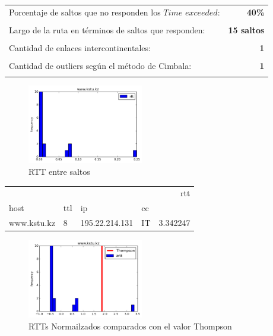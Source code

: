 \begin{center}
\begin{tabular}{p{6.5cm}r}
Porcentaje de saltos que no responden los $Time$ $exceeded$: & \textbf{40\%} \\ \\ 
Largo de la ruta en términos de saltos que responden: &\textbf{15 saltos} \\ \\
Cantidad de enlaces intercontinentales: & \textbf{1} \\ \\
Cantidad de outliers según el método de Cimbala: & \textbf{1} \\ \\
\end{tabular}
\end{center}


\begin{figure}[H]
  \centering
    \includegraphics[width=0.45\textwidth]{histogramas_rtt/www-kstu-kz.png}
  \caption{RTT entre saltos}
  \label{entropia-s}
\end{figure}

\begin{center}
\begin{tabular}{llllr}
\toprule
            &    &               &    &       rtt \\
host & ttl & ip & cc &           \\
\midrule
www.kstu.kz & 8  & 195.22.214.131 & IT &  3.342247 \\
\bottomrule
\end{tabular}
\end{center}


\begin{figure}[H]
  \centering
    \includegraphics[width=0.45\textwidth]{histogramas_thompson/www-kstu-kz.png}
  \caption{RTTs Normailzados comparados con el valor Thompson}
  \label{entropia-s}
\end{figure}


